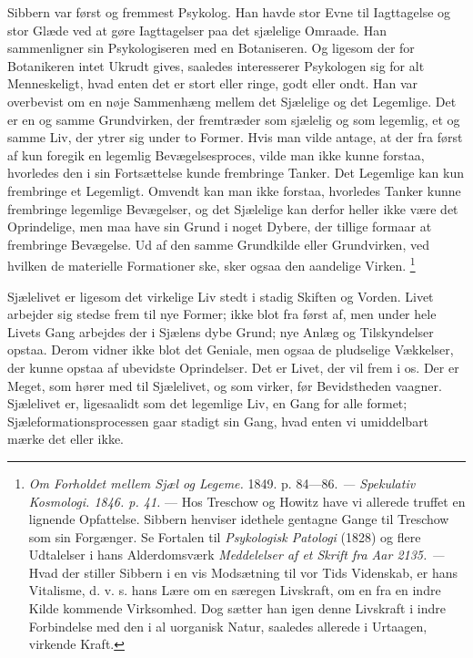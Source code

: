 \documentclass[12pt,a4paper,openany]{book}
\newcommand{\opage}[1]{\marginnote{\footnotesize\textit{[#1]}}}
\begin{document}
\setcounter{footnote}{0}%
\opage{99}Sibbern var først og fremmest Psykolog. Han havde stor Evne til
Iagttagelse og stor Glæde ved at gøre Iagttagelser paa det sjælelige Omraade.
Han sammenligner sin Psykologiseren med en Botaniseren. Og ligesom der for
Botanikeren intet Ukrudt gives, saaledes interesserer Psykologen sig for alt
Menneskeligt, hvad enten det er stort eller ringe, godt eller ondt. Han var
overbevist om en nøje Sammenhæng mellem det Sjælelige og det Legemlige. Det er
en og samme Grundvirken, der fremtræder som sjælelig og som legemlig, et og
samme Liv, der ytrer sig under to Former. Hvis man vilde antage, at der fra
først af kun foregik en legemlig Bevægelsesproces, vilde man ikke kunne
forstaa, hvorledes den i sin Fortsættelse kunde frembringe Tanker. Det
Legemlige kan kun frembringe et Legemligt. Omvendt kan man ikke forstaa,
hvorledes Tanker kunne frembringe legemlige Bevægelser, og det Sjælelige kan
derfor heller ikke være det Oprindelige, men maa have sin Grund i noget Dybere,
der tillige formaar at frembringe Bevægelse. Ud af den samme Grundkilde eller
Grundvirken, ved hvilken de materielle Formationer ske, sker ogsaa den
aandelige Virken.%
\footnote[1]{\textit{Om Forholdet mellem Sjæl og Legeme.} 1849. p. 84---86.
\textit{--- Spekulativ Kosmologi. 1846. p. 41.} --- Hos Treschow og Howitz have
vi allerede truffet en lignende Opfattelse. Sibbern henviser idethele gentagne
Gange til Treschow som sin Forgænger. Se Fortalen til \textit{Psykologisk
Patologi} (1828) og flere Udtalelser i hans Alderdomsværk \textit{Meddelelser
af et Skrift fra Aar 2135. ---} Hvad der stiller Sibbern i en vis Modsætning
til vor Tids Videnskab, er hans Vitalisme, d. v. s. hans Lære om en særegen
Livskraft, om en fra en indre Kilde kommende Virksomhed. Dog sætter han igen
denne Livskraft i indre Forbindelse med den i al uorganisk Natur, saaledes
allerede i Urtaagen, virkende Kraft.}

Sjælelivet er ligesom det virkelige Liv stedt i stadig Skiften og Vorden. Livet
arbejder sig stedse frem til nye Former;
\setcounter{footnote}{0}%
\opage{100}ikke blot fra først af, men under hele Livets Gang arbejdes der i
Sjælens dybe Grund; nye Anlæg og Tilskyndelser opstaa. Derom vidner ikke blot
det Geniale, men ogsaa de pludselige Vækkelser, der kunne opstaa af ubevidste
Oprindelser. Det er Livet, der vil frem i os. Der er Meget, som hører med til
Sjælelivet, og som virker, før Bevidstheden vaagner. Sjælelivet er, ligesaalidt
som det legemlige Liv, en Gang for alle formet; Sjæleformationsprocessen gaar
stadigt sin Gang, hvad enten vi umiddelbart mærke det eller ikke.
\end{document}
